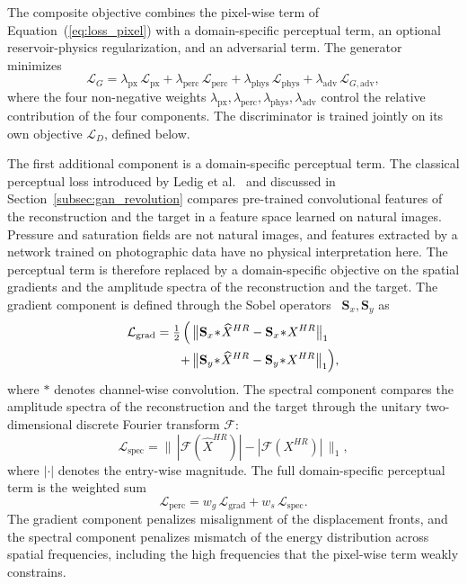 The composite objective combines the pixel-wise term of Equation~(\ref{eq:loss_pixel}) with a domain-specific perceptual term, an optional reservoir-physics regularization, and an adversarial term. The generator minimizes
\begin{equation}
    \mathcal{L}_{G} = \lambda_{\mathrm{px}} \, \mathcal{L}_{\mathrm{px}} + \lambda_{\mathrm{perc}} \, \mathcal{L}_{\mathrm{perc}} + \lambda_{\mathrm{phys}} \, \mathcal{L}_{\mathrm{phys}} + \lambda_{\mathrm{adv}} \, \mathcal{L}_{G,\mathrm{adv}},
    \label{eq:loss_composite}
\end{equation}
where the four non-negative weights $\lambda_{\mathrm{px}}, \lambda_{\mathrm{perc}}, \lambda_{\mathrm{phys}}, \lambda_{\mathrm{adv}}$ control the relative contribution of the four components. The discriminator is trained jointly on its own objective $\mathcal{L}_{D}$, defined below.

The first additional component is a domain-specific perceptual term. The classical perceptual loss introduced by Ledig et al.~\cite{cvf_srgan} and discussed in Section~\ref{subsec:gan_revolution} compares pre-trained convolutional features of the reconstruction and the target in a feature space learned on natural images. Pressure and saturation fields are not natural images, and features extracted by a network trained on photographic data have no physical interpretation here. The perceptual term is therefore replaced by a domain-specific objective on the spatial gradients and the amplitude spectra of the reconstruction and the target. The gradient component is defined through the Sobel operators~\cite{sobel1968isotropic} $\mathbf{S}_x, \mathbf{S}_y$ as
\begin{equation}
\begin{aligned}
    \mathcal{L}_{\mathrm{grad}} = \tfrac{1}{2} \, \Bigl( \, &\bigl\| \mathbf{S}_x \!*\! \widehat{X}^{HR} - \mathbf{S}_x \!*\! X^{HR} \bigr\|_{1} \\
    + \, &\bigl\| \mathbf{S}_y \!*\! \widehat{X}^{HR} - \mathbf{S}_y \!*\! X^{HR} \bigr\|_{1} \Bigr),
\end{aligned}
\label{eq:loss_grad}
\end{equation}
where $*$ denotes channel-wise convolution. The spectral component compares the amplitude spectra of the reconstruction and the target through the unitary two-dimensional discrete Fourier transform $\mathcal{F}$:
\begin{equation}
    \mathcal{L}_{\mathrm{spec}} = \bigl\| \, |\mathcal{F}(\widehat{X}^{HR})| - |\mathcal{F}(X^{HR})| \, \bigr\|_{1},
    \label{eq:loss_spec}
\end{equation}
where $|\cdot|$ denotes the entry-wise magnitude. The full domain-specific perceptual term is the weighted sum
\begin{equation}
    \mathcal{L}_{\mathrm{perc}} = w_{g} \, \mathcal{L}_{\mathrm{grad}} + w_{s} \, \mathcal{L}_{\mathrm{spec}}.
    \label{eq:loss_perc}
\end{equation}
The gradient component penalizes misalignment of the displacement fronts, and the spectral component penalizes mismatch of the energy distribution across spatial frequencies, including the high frequencies that the pixel-wise term weakly constrains.

